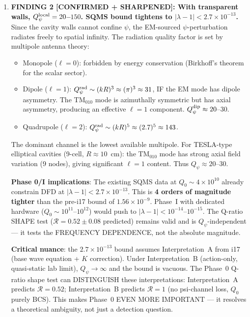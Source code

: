 \documentclass[11pt]{article}
\newcommand{\ee}[1]{\times 10^{#1}}
\newcommand{\Qpsi}{Q_\psi}
\newcommand{\lbone}{|\lambda - 1|}
\theoremstyle{definition}
\theoremstyle{remark}
\begin{document}
\begin{tcolorbox}[colback=blue!5!white, colframe=blue!60!black,
  title=\textbf{W4i18 P2: SQMS BOUND REASSESSMENT --- 5 KEY RESULTS}]
\begin{enumerate}
\item \textbf{FINDING 2 [CONFIRMED + SHARPENED]: With transparent walls,
  $\Qpsi^{\rm local} = 20$--$150$. SQMS bound tightens to
  $\lbone < 2.7\ee{-13}$.}
  Since the cavity walls cannot confine $\psi$, the EM-sourced
  $\psi$-perturbation radiates freely to spatial infinity. The
  radiation quality factor is set by multipole antenna theory:
  \begin{itemize}[nosep]
  \item Monopole ($\ell = 0$): forbidden by energy conservation
    (Birkhoff's theorem for the scalar sector).
  \item Dipole ($\ell = 1$): $\Qpsi^{\rm rad} \sim (kR)^3 \approx
    (\pi)^3 \approx 31$, IF the EM mode has dipole asymmetry.
    The TM$_{010}$ mode is azimuthally symmetric but has axial
    asymmetry, producing an effective $\ell = 1$ component.
    $\Qpsi^{\rm dip} \approx 20$--$30$.
  \item Quadrupole ($\ell = 2$): $\Qpsi^{\rm rad} \sim (kR)^5
    \approx (2.7)^5 \approx 143$.
  \end{itemize}
  The dominant channel is the lowest available multipole.
  For TESLA-type elliptical cavities (9-cell, $R \approx 10$~cm):
  the TM$_{010}$ mode has strong axial field variation (9 nodes),
  giving significant $\ell = 1$ content. Thus $\Qpsi \approx 20$--$30$.

  \textbf{Phase 0/I implications}: The existing SQMS data at
  $Q_0 \sim 4\ee{10}$ already constrain DFD at $\lbone < 2.7\ee{-13}$.
  This is \textbf{4 orders of magnitude tighter} than the pre-i17
  bound of $1.56\ee{-9}$. Phase~I with dedicated hardware ($Q_0
  \sim 10^{11}$--$10^{12}$) would push to $\lbone < 10^{-14}$--$10^{-15}$.
  The Q-ratio SHAPE test ($\mathcal{R} = 0.52 \pm 0.08$ predicted)
  remains valid and is $\Qpsi$-independent --- it tests the FREQUENCY
  DEPENDENCE, not the absolute magnitude.

  \textbf{Critical nuance}: the $2.7\ee{-13}$ bound assumes
  Interpretation~A from i17 (base wave equation + $K$ correction).
  Under Interpretation~B (action-only, quasi-static lab limit),
  $\Qpsi \to \infty$ and the bound is vacuous. The Phase~0 Q-ratio
  shape test can DISTINGUISH these interpretations: Interpretation~A
  predicts $\mathcal{R} = 0.52$; Interpretation~B predicts $\mathcal{R}
  = 1$ (no psi-channel loss, $Q_0$ purely BCS). This makes Phase~0
  EVEN MORE IMPORTANT --- it resolves a theoretical ambiguity, not
  just a detection question.


\end{enumerate}
\end{tcolorbox}
\end{document}
